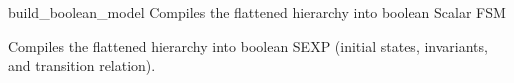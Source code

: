 \begin{nusmvCommand} {build\_boolean\_model} {Compiles the flattened hierarchy into boolean Scalar FSM}


Compiles the flattened hierarchy into boolean SEXP (initial states,
invariants, and transition relation).
\begin{cmdOpt}
 
\end{cmdOpt}
\end{nusmvCommand}
